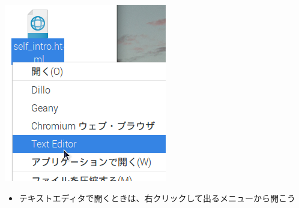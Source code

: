 \documentclass[dvipdfmx]{beamer}
\begin{document}
\begin{frame}[fragile]
\begin{minipage}[b]{0.47\textwidth}
      \includegraphics[width=\textwidth]{slide04_014.png}
      \begin{itemize}
        \item テキストエディタで開くときは、右クリックして出るメニューから開こう
      \end{itemize}
    \end{minipage} 
\end{frame}
\end{document}
